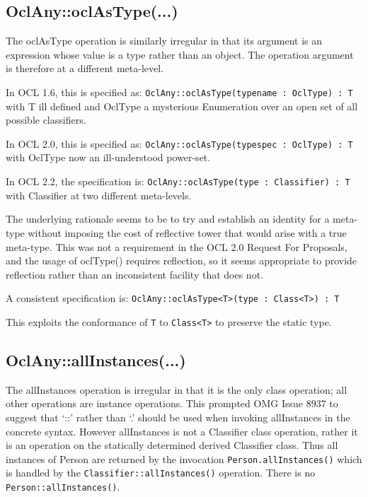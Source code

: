 \documentclass{eceasst}
\begin{document}
\subsection{OclAny::oclAsType(...)}

The oclAsType operation is similarly irregular in that its argument is an expression whose value is a type rather than an object. The operation argument is therefore at a different meta-level.

In OCL 1.6, this is specified as: \verb!OclAny::oclAsType(typename : OclType) : T!  with T ill defined and OclType a mysterious Enumeration over an open set of all possible classifiers.

In OCL 2.0, this is specified as: \verb!OclAny::oclAsType(typespec : OclType) : T! with OclType now an ill-understood power-set.

In OCL 2.2, the specification is: \verb!OclAny::oclAsType(type : Classifier) : T! with Classifier at two different meta-levels.

The underlying rationale seems to be to try and establish an identity for a meta-type without imposing the cost of reflective tower that would arise with a true meta-type. This was not a requirement in the OCL 2.0 Request For Proposals\cite{OCL-RFP}, and the usage of oclType() requires reflection, so it seems appropriate to provide reflection rather than an inconsistent facility that does not.

A consistent specification is: \verb!OclAny::oclAsType<T>(type : Class<T>) : T!

This exploits the conformance of \verb!T! to \verb!Class<T>! to preserve the static type.

\subsection{OclAny::allInstances(...)}

The allInstances operation is irregular in that it is the only class operation; all other operations are instance operations. This prompted OMG Issue 8937 to suggest that `::' rather than `.' should be used when invoking allInstances in the concrete syntax. However allInstances is not a Classifier class operation, rather it is an operation on the statically determined derived Classifier class. Thus all instances of Person are returned by the invocation  \verb!Person.allInstances()! which is handled by the  \verb!Classifier::allInstances()! operation. There is no  \verb!Person::allInstances()!. 
\end{document}
